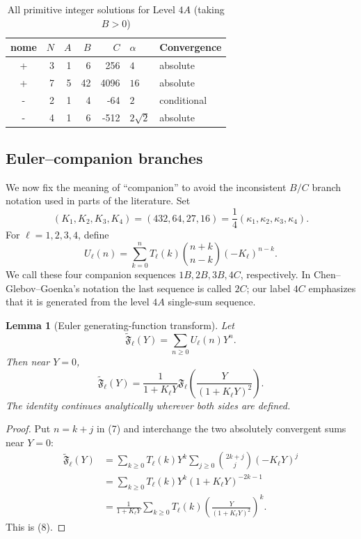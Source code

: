 \documentclass[11pt,a4paper]{amsart} %
\newtheorem{lemma}[theorem]{Lemma}
\theoremstyle{definition}
\begin{document}
\begin{table}[htbp]
\centering
\caption{All primitive integer solutions for Level \(4A\) (taking \(B>0\))}\label{tab:4Acomplete}
\footnotesize
\setlength{\tabcolsep}{5pt}
\renewcommand{\arraystretch}{1.14}
\begin{tabular}{@{}c r r r r l l@{}}
\toprule
nome & \(N\) & \(A\) & \(B\) & \(C\) & \(\alpha\) & Convergence\\
\midrule
+&3&1&6&256&\(4\)&absolute\\
+&7&5&42&4096&\(16\)&absolute\\
-&2&1&4&-64&\(2\)&conditional\\
-&4&1&6&-512&\(2\sqrt2\)&absolute\\
\bottomrule
\end{tabular}
\end{table}


\subsection*{Euler--companion branches}

We now fix the meaning of ``companion'' to avoid the inconsistent \(B/C\)
branch notation used in parts of the literature. Set
\[
(K_1,K_2,K_3,K_4)=(432,64,27,16)=\frac14
(\kappa_1,\kappa_2,\kappa_3,\kappa_4).
\tag{6}
\]
For \(\ell=1,2,3,4\), define
\[
U_\ell(n)=
\sum_{k=0}^{n}T_\ell(k)
\binom{n+k}{n-k}(-K_\ell)^{n-k}.
\tag{7}
\]
We call these four companion sequences \(1B,2B,3B,4C\), respectively.
In Chen--Glebov--Goenka's notation the last sequence is called \(2C\);
our label \(4C\) emphasizes that it is generated from the level \(4A\)
single-sum sequence.

\begin{lemma}[Euler generating-function transform]\label{lem:eulertransform}
Let
\[
\widetilde{\mathfrak F}_\ell(Y)=\sum_{n\ge0}U_\ell(n)Y^n.
\]
Then near \(Y=0\),
\[
\widetilde{\mathfrak F}_\ell(Y)
=
\frac1{1+K_\ell Y}
{\mathfrak F}_\ell\!\left(
\frac{Y}{(1+K_\ell Y)^2}
\right).
\tag{8}
\]
The identity continues analytically wherever both sides are defined.
\end{lemma}

\begin{proof}
Put \(n=k+j\) in (7) and interchange the two absolutely convergent sums near
\(Y=0\):
\[
\begin{aligned}
\widetilde{\mathfrak F}_\ell(Y)
&=\sum_{k\ge0}T_\ell(k)Y^k
\sum_{j\ge0}\binom{2k+j}{j}(-K_\ell Y)^j\\
&=\sum_{k\ge0}T_\ell(k)Y^k(1+K_\ell Y)^{-2k-1}\\
&=\frac1{1+K_\ell Y}
\sum_{k\ge0}T_\ell(k)
\left(\frac{Y}{(1+K_\ell Y)^2}\right)^k.
\end{aligned}
\]
This is (8).
\end{proof}
\end{document}
